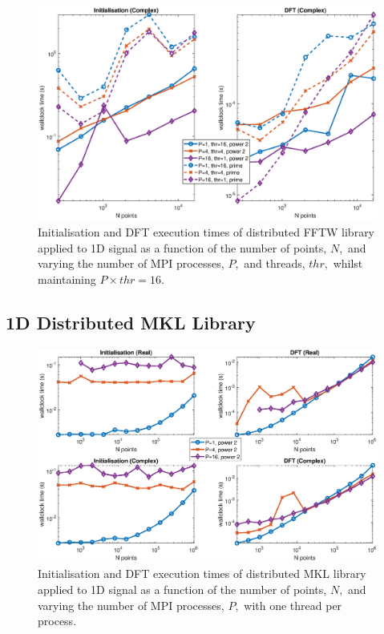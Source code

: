 \documentclass[a4paper]{article}
\begin{document}
\begin{figure}[htb]
    \centering
    \includegraphics[width=\linewidth]{../results/fftw_1d_mpi_thr.eps}
  \caption{Initialisation and DFT execution times of distributed FFTW library applied to 1D signal as a function of the
    number of points, $N,$ and varying the number of MPI processes, $P,$ and threads, $thr,$ whilst maintaining $P\times thr=16.$}
  \label{1DDistFFTW16}
\end{figure}



\subsection{1D Distributed MKL Library}\label{Sec:1DDistMKL}

\begin{figure}[htb]
    \centering
    \includegraphics[width=\linewidth]{../results/mkl_1d_mpi.eps}
  \caption{Initialisation and DFT execution times of distributed MKL library applied to 1D signal as a function of the
    number of points, $N,$ and varying the number of MPI processes, $P,$ with one thread per process.}
  \label{1DDistMKL}
\end{figure}
\end{document}
